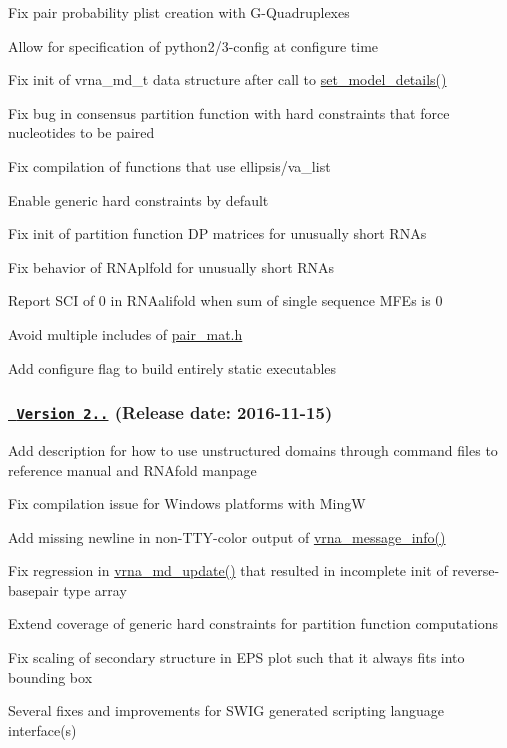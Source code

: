 \begin{DoxyItemize}
\item Fix pair probability plist creation with G-\/\+Quadruplexes
\item Allow for specification of python2/3-\/config at configure time
\item Fix init of vrna\+\_\+md\+\_\+t data structure after call to \mbox{\hyperlink{group__model__details_gabad896c3650d420f3f3ddefc69e2bceb}{set\+\_\+model\+\_\+details()}}
\item Fix bug in consensus partition function with hard constraints that force nucleotides to be paired
\item Fix compilation of functions that use ellipsis/va\+\_\+list
\item Enable generic hard constraints by default
\item Fix init of partition function DP matrices for unusually short R\+N\+As
\item Fix behavior of R\+N\+Aplfold for unusually short R\+N\+As
\item Report S\+CI of 0 in R\+N\+Aalifold when sum of single sequence M\+F\+Es is 0
\item Avoid multiple includes of \mbox{\hyperlink{pair__mat_8h_source}{pair\+\_\+mat.\+h}}
\item Add configure flag to build entirely static executables
\end{DoxyItemize}

\subsubsection*{\href{https://github.com/ViennaRNA/ViennaRNA/compare/v2.3.0...v2.3.1}{\texttt{ Version 2..}} (Release date\+: 2016-\/11-\/15)}


\begin{DoxyItemize}
\item Add description for how to use unstructured domains through command files to reference manual and R\+N\+Afold manpage
\item Fix compilation issue for Windows platforms with MingW
\item Add missing newline in non-\/\+T\+T\+Y-\/color output of \mbox{\hyperlink{group__message__utils_ga039bae6153a6415b054dbe6045f83d03}{vrna\+\_\+message\+\_\+info()}}
\item Fix regression in \mbox{\hyperlink{group__model__details_ga36ae40b8c3b82362f5798ad5b047b814}{vrna\+\_\+md\+\_\+update()}} that resulted in incomplete init of reverse-\/basepair type array
\item Extend coverage of generic hard constraints for partition function computations
\item Fix scaling of secondary structure in E\+PS plot such that it always fits into bounding box
\item Several fixes and improvements for S\+W\+IG generated scripting language interface(s)
\end{DoxyItemize}

